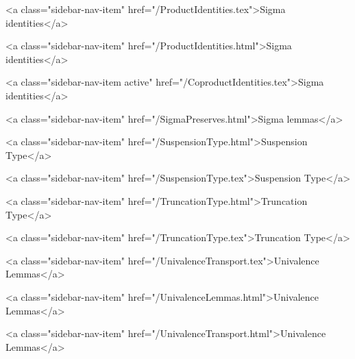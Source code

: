       
    
      
        
          <a class="sidebar-nav-item" href="/ProductIdentities.tex">Sigma identities</a>
        
      
    
      
        
          <a class="sidebar-nav-item" href="/ProductIdentities.html">Sigma identities</a>
        
      
    
      
        
          <a class="sidebar-nav-item active" href="/CoproductIdentities.tex">Sigma identities</a>
        
      
    
      
        
          <a class="sidebar-nav-item" href="/SigmaPreserves.html">Sigma lemmas</a>
        
      
    
      
        
          <a class="sidebar-nav-item" href="/SuspensionType.html">Suspension Type</a>
        
      
    
      
        
          <a class="sidebar-nav-item" href="/SuspensionType.tex">Suspension Type</a>
        
      
    
      
        
          <a class="sidebar-nav-item" href="/TruncationType.html">Truncation Type</a>
        
      
    
      
        
          <a class="sidebar-nav-item" href="/TruncationType.tex">Truncation Type</a>
        
      
    
      
        
          <a class="sidebar-nav-item" href="/UnivalenceTransport.tex">Univalence Lemmas</a>
        
      
    
      
        
          <a class="sidebar-nav-item" href="/UnivalenceLemmas.html">Univalence Lemmas</a>
        
      
    
      
        
          <a class="sidebar-nav-item" href="/UnivalenceTransport.html">Univalence Lemmas</a>
        
